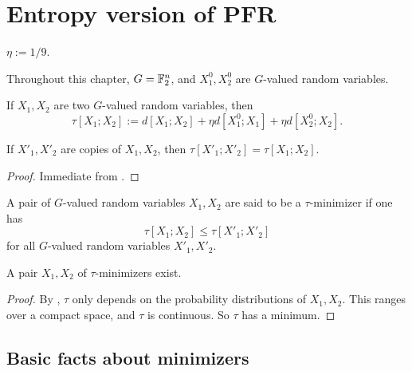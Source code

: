 \chapter{Entropy version of PFR}

\begin{definition}\label{eta-def}
 \leanok
  $\eta := 1/9$.
\end{definition}

Throughout this chapter,  $G = \mathbb{F}_2^n$, and $X^0_1, X^0_2$ are $G$-valued random variables.

\begin{definition}\label{tau-def}
  \leanok
If $X_1,X_2$ are two $G$-valued random variables, then
$$  \tau[X_1; X_2] := d[X_1; X_2] + \eta  d[X^0_1; X_1] + \eta d[X^0_2; X_2].$$
\end{definition}

\begin{lemma}\label{tau-copy}\leanok
    If $X'_1, X'_2$ are copies of $X_1,X_2$, then $\tau[X'_1;X'_2] = \tau[X_1;X_2]$.
\end{lemma}


\begin{proof}\leanok Immediate from .
\end{proof}

\begin{definition}\label{tau-min-def}
\leanok
A pair of $G$-valued random variables $X_1, X_2$ are said to be a $\tau$-minimizer if one has
  $$\tau[X_1;X_2] \leq \tau[X'_1;X'_2]
  $$
for all $G$-valued random variables $X'_1, X'_2$.
\end{definition}


\begin{proposition}\label{tau-min}
  \leanok
A pair $X_1, X_2$ of $\tau$-minimizers exist.
\end{proposition}

\begin{proof}\leanok By , $\tau$ only depends on the probability distributions of $X_1, X_2$. This ranges over a compact space, and $\tau$ is continuous.  So $\tau$ has a minimum.
\end{proof}

\section{Basic facts about minimizers}

